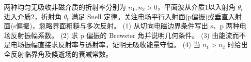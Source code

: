 两种均匀无吸收非磁介质的折射率分别为 \(n_1,n_2>0\)，平面波从介质1以入射角 \(\theta_i\) 进入介质2，折射角 \(\theta_t\) 满足 Snell 定律。关注电场平行入射面(p偏振)或垂直入射面(s偏振)，忽略界面粗糙与多次反射。
(1) 从切向电磁边界条件写出 s、p 两种电场反射振幅系数。
(2) 求 p 偏振的 Brewster 角并说明几何条件。
(3) 由能流而不是电场振幅直接求反射率与透射率，证明无吸收能量守恒。
(4) 当 \(n_1>n_2\) 时给出全反射临界角及倏逝场的衰减常数。

